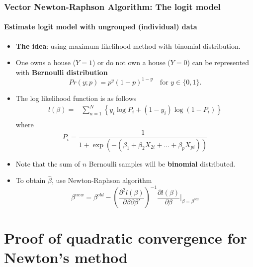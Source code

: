\documentclass[10pt]{beamer}
\begin{document}
\begin{frame}
  \frametitle{Vector Newton-Raphson Algorithm: The logit model}
  \framesubtitle{Estimate logit model with ungrouped (individual) data}
  \begin{itemize}
  \item \textbf{The idea}: using maximum likelihood method with binomial
    distribution.
  \item One owns a house ($Y=1$) or do not own a house ($Y=0$) can be
    represented with \textbf{Bernoulli distribution}
    \begin{equation*}
      Pr(y;p) = p^y (1-p)^{1-y}\!\quad \text{for }y\in\{0,1\}.
    \end{equation*}
  \item The log likelihood function is as follows
    \begin{equation*}
      \begin{split}
        l(\beta)=& \sum \limits_{n=1}^N\left\{ y_i \log P_i + (1- y_i)
          \log (1-P_i)  \right\}\\
      \end{split}
    \end{equation*}
    where
    \begin{equation*}
      P_i=\frac{1}{1+\exp(-(\beta_1+\beta_2X_{2i}+...+\beta_pX_{pi}))}
    \end{equation*}

  \item Note that the sum of $n$ Bernoulli samples will be \textbf{binomial}
    distributed.

  \item To obtain $\hat \beta$, use Newton-Raphson algorithm
    \begin{equation*}
      \beta^{new} = \beta^{old} - \left(\frac{\partial^2l(\beta)}{\partial
          \beta\partial \beta'}  \right)^{-1} \frac{\partial
        l(\beta)}{\partial\beta} | _{\beta= \beta^{old}}
    \end{equation*}

  \end{itemize}
\end{frame}


\section{Proof of quadratic convergence for Newton's method}
\end{document}

